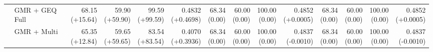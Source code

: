 \documentclass{article}
\begin{document}
{\begin{tabular}{llrrrrrrrrrrrr}
 & GMR + GEQ Full & \shortstack{68.15 \\ {\scriptsize\textcolor{Gain}{(+15.64)}}} & \shortstack{59.90 \\ {\scriptsize\textcolor{Gain}{(+59.90)}}} & \shortstack{99.59 \\ {\scriptsize\textcolor{Gain}{(+99.59)}}} & \shortstack{0.4832 \\ {\scriptsize\textcolor{Gain}{(+0.4698)}}} & \shortstack{68.34 \\ {\scriptsize\textcolor{Zero}{(0.00)}}} & \shortstack{60.00 \\ {\scriptsize\textcolor{Zero}{(0.00)}}} & \shortstack{100.00 \\ {\scriptsize\textcolor{Zero}{(0.00)}}} & \shortstack{0.4852 \\ {\scriptsize\textcolor{Gain}{(+0.0005)}}} & \shortstack{68.34 \\ {\scriptsize\textcolor{Zero}{(0.00)}}} & \shortstack{60.00 \\ {\scriptsize\textcolor{Zero}{(0.00)}}} & \shortstack{100.00 \\ {\scriptsize\textcolor{Zero}{(0.00)}}} & \shortstack{0.4852 \\ {\scriptsize\textcolor{Gain}{(+0.0005)}}} \\
 & GMR + Multi & \shortstack{65.35 \\ {\scriptsize\textcolor{Gain}{(+12.84)}}} & \shortstack{59.65 \\ {\scriptsize\textcolor{Gain}{(+59.65)}}} & \shortstack{83.54 \\ {\scriptsize\textcolor{Gain}{(+83.54)}}} & \shortstack{0.4070 \\ {\scriptsize\textcolor{Gain}{(+0.3936)}}} & \shortstack{68.34 \\ {\scriptsize\textcolor{Zero}{(0.00)}}} & \shortstack{60.00 \\ {\scriptsize\textcolor{Zero}{(0.00)}}} & \shortstack{100.00 \\ {\scriptsize\textcolor{Zero}{(0.00)}}} & \shortstack{0.4837 \\ {\scriptsize\textcolor{Loss}{(-0.0010)}}} & \shortstack{68.34 \\ {\scriptsize\textcolor{Zero}{(0.00)}}} & \shortstack{60.00 \\ {\scriptsize\textcolor{Zero}{(0.00)}}} & \shortstack{100.00 \\ {\scriptsize\textcolor{Zero}{(0.00)}}} & \shortstack{0.4837 \\ {\scriptsize\textcolor{Loss}{(-0.0010)}}} \\

\end{tabular}}
\end{document}
